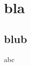 \documentclass{beamer}
\begin{document}
\section{bla}
\subsection{blub}
\begin{frame}
    abc
\end{frame} 
\end{document}
